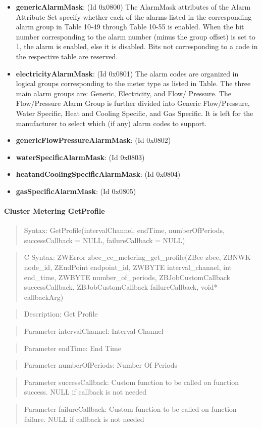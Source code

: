 \begin{itemize}
\item \textbf{genericAlarmMask}: (Id 0x0800) The AlarmMask attributes of the Alarm Attribute Set specify whether each of the alarms listed in the corresponding alarm group in Table 10-49 through Table 10-55 is enabled. When the bit number corresponding to the alarm number (minus the group offset) is set to 1, the alarm is enabled, else it is disabled. Bits not corresponding to a code in the respective table are reserved.
\item \textbf{electricityAlarmMask}: (Id 0x0801) The alarm codes are organized in logical groups corresponding to the meter type as listed in Table. The three main alarm groups are: Generic, Electricity, and Flow/ Pressure. The Flow/Pressure Alarm Group is further divided into Generic Flow/Pressure, Water Specific, Heat and Cooling Specific, and Gas Specific. It is left for the manufacturer to select which (if any) alarm codes to support.
\item \textbf{genericFlowPressureAlarmMask}: (Id 0x0802)
\item \textbf{waterSpecificAlarmMask}: (Id 0x0803)
\item \textbf{heatandCoolingSpecificAlarmMask}: (Id 0x0804)
\item \textbf{gasSpecificAlarmMask}: (Id 0x0805)
\end{itemize}

\paragraph{Cluster Metering GetProfile}
\begin{quote}Syntax: GetProfile(intervalChannel, endTime, numberOfPeriods, successCallback = NULL, failureCallback = NULL)\end{quote}
\begin{quote}C Syntax: ZWError zbee\_cc\_metering\_get\_profile(ZBee zbee, ZBNWK node\_id, ZEndPoint endpoint\_id, ZWBYTE interval\_channel, int end\_time, ZWBYTE number\_of\_periods, ZBJobCustomCallback successCallback, ZBJobCustomCallback failureCallback, void* callbackArg)\end{quote}
\begin{quote}Description: Get Profile\end{quote}
\begin{quote}Parameter intervalChannel: Interval Channel\end{quote}
\begin{quote}Parameter endTime: End Time\end{quote}
\begin{quote}Parameter numberOfPeriods: Number Of Periods\end{quote}
\begin{quote}Parameter successCallback: Custom function to be called on function success. NULL if callback is not needed\end{quote}
\begin{quote}Parameter failureCallback: Custom function to be called on function failure. NULL if callback is not needed\end{quote}



